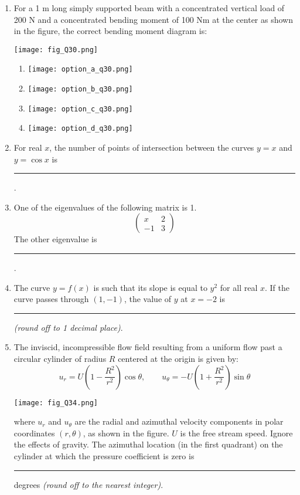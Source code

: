 \documentclass[12pt]{article}
\begin{document}
\begin{enumerate}[label=Q.\arabic*, start=26]
	\item For a 1 m long simply supported beam with a concentrated vertical load of 200 N and a concentrated bending moment of 100 Nm at the center as shown in the figure, the correct bending moment diagram is:

		\begin{center}
			\texttt{[image: fig\_Q30.png]} 
		\end{center}

		\begin{enumerate}[label=(\Alph*)]
			\item \texttt{[image: option\_a\_q30.png]} 
			\item \texttt{[image: option\_b\_q30.png]} 
			\item \texttt{[image: option\_c\_q30.png]} 
			\item \texttt{[image: option\_d\_q30.png]} 
		\end{enumerate}
		\newpage
	\item For real $x$, the number of points of intersection between the curves $y = x$ and $y = \cos x$ is \rule{2cm}{0.15mm}.

	\item One of the eigenvalues of the following matrix is 1.\\[6pt]
		\[
			\begin{pmatrix}
				x & 2 \\
				-1 & 3
			\end{pmatrix}
		\] 
		The other eigenvalue is \rule{2cm}{0.15mm}.

	\item The curve $y = f(x)$ is such that its slope is equal to $y^2$ for all real $x$. If the curve passes through $(1, -1)$, the value of $y$ at $x = -2$ is \rule{3cm}{0.15mm} \textit{(round off to 1 decimal place)}.
	\item The inviscid, incompressible flow field resulting from a uniform flow past a circular cylinder of radius $R$ centered at the origin is given by:
		\[
			u_r = U \left(1 - \frac{R^2}{r^2} \right) \cos\theta, \qquad 
			u_\theta = -U \left(1 + \frac{R^2}{r^2} \right) \sin\theta
		\]
		\begin{center}
			\texttt{[image: fig\_Q34.png]} 
		\end{center}
		where $u_r$ and $u_\theta$ are the radial and azimuthal velocity components in polar coordinates $(r, \theta)$, as shown in the figure. $U$ is the free stream speed. Ignore the effects of gravity. The azimuthal location (in the first quadrant) on the cylinder at which the pressure coefficient is zero is \rule{1.5cm}{0.15mm} degrees \textit{(round off to the nearest integer)}.


\end{enumerate}
\end{document}
